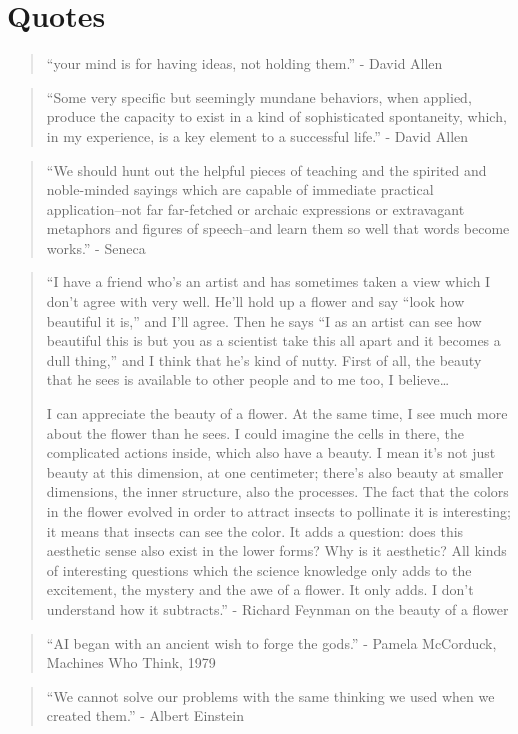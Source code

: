\chapter{Quotes}

\begin{quotation}
“your mind is for having ideas, not holding them.” - David Allen
\end{quotation}

\begin{quotation}
``Some very specific but seemingly mundane behaviors, when applied, produce the capacity to exist in a kind of sophisticated spontaneity, which, in my experience, is a key element to a successful life.'' - David Allen
\end{quotation}

\begin{quotation}
“We should hunt out the helpful pieces of teaching and the spirited and noble-minded sayings which are capable of immediate practical application–not far far-fetched or archaic expressions or extravagant metaphors and figures of speech–and learn them so well that words become works.” - Seneca
\end{quotation}

\begin{quotation}
``I have a friend who’s an artist and has sometimes taken a view which I don’t agree with very well. He’ll hold up a flower and say “look how beautiful it is,” and I’ll agree. Then he says “I as an artist can see how beautiful this is but you as a scientist take this all apart and it becomes a dull thing,” and I think that he’s kind of nutty. First of all, the beauty that he sees is available to other people and to me too, I believe…

I can appreciate the beauty of a flower. At the same time, I see much more about the flower than he sees. I could imagine the cells in there, the complicated actions inside, which also have a beauty. I mean it’s not just beauty at this dimension, at one centimeter; there’s also beauty at smaller dimensions, the inner structure, also the processes. The fact that the colors in the flower evolved in order to attract insects to pollinate it is interesting; it means that insects can see the color. It adds a question: does this aesthetic sense also exist in the lower forms? Why is it aesthetic? All kinds of interesting questions which the science knowledge only adds to the excitement, the mystery and the awe of a flower. It only adds. I don’t understand how it subtracts.'' - Richard Feynman on the beauty of a flower
\end{quotation}

\begin{quote}
``AI began with an ancient wish to forge the gods.'' - Pamela McCorduck, Machines Who Think, 1979
\end{quote}

\begin{quote}
``We cannot solve our problems with the same thinking we used when we created them.'' - Albert Einstein
\end{quote}

